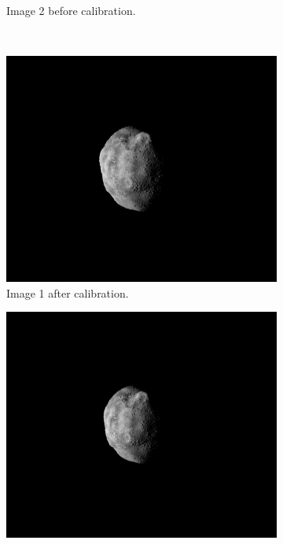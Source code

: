 \begin{figure}[htb]
\begin{subfigure}[b]{0.48\textwidth}
                \caption{Image 2 before calibration.}
                \label{fig:composition_before_2}
        \end{subfigure}
        \\
        \begin{subfigure}[b]{0.48\textwidth}
            \centering
                \includegraphics[width=\textwidth]{doc/thesis/0_figures/rendering_lighting/Inst_2017-08-15T115858-281000.png}
                \caption{Image 1 after calibration.}
                \label{fig:composition_after_1}
        \end{subfigure}
        \begin{subfigure}[b]{0.48\textwidth}
            \centering
                \includegraphics[width=\textwidth]{doc/thesis/0_figures/rendering_lighting/Inst_2017-08-15T115859-288000.png}

\end{subfigure}
\end{figure}
